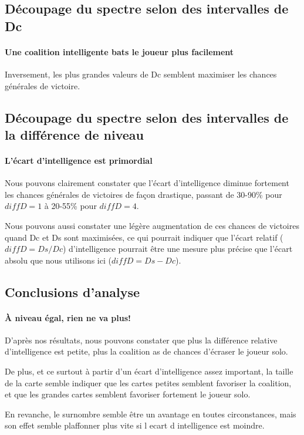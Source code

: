 \subsection{Découpage du spectre selon des intervalles de Dc}
\paragraph{Une coalition intelligente bats le joueur plus facilement}
Inversement, les plus grandes valeurs de Dc semblent maximiser les chances générales de victoire.


\subsection{Découpage du spectre selon des intervalles de la différence de niveau}
\paragraph{L'écart d'intelligence est primordial}
Nous pouvons clairement constater que l'écart d'intelligence diminue fortement les chances générales de victoires de façon drastique, passant de 30-90\% pour $diffD = 1$ à 20-55\% pour $diffD = 4$.

Nous pouvons aussi constater une légère augmentation de ces chances de victoires quand Dc et Ds sont maximisées, ce qui pourrait indiquer que l'écart relatif ($diffD = Ds/Dc$) d'intelligence pourrait être une mesure plus précise que l'écart absolu que nous utilisons ici ($diffD = Ds - Dc$).

\subsection{Conclusions d'analyse}

\paragraph{À niveau égal, rien ne va plus!}
D'après nos résultats, nous pouvons constater que plus la différence relative d'intelligence est petite, plus la coalition as de chances d'écraser le joueur solo.

De plus, et ce surtout à partir d'un écart d'intelligence assez important, la taille de la carte semble indiquer que les cartes petites semblent favoriser la coalition, et que les grandes cartes semblent favoriser fortement le joueur solo. 

En revanche, le surnombre semble être un avantage en toutes circonstances, mais son effet semble plaffonner plus vite si l ecart d intelligence est moindre.


